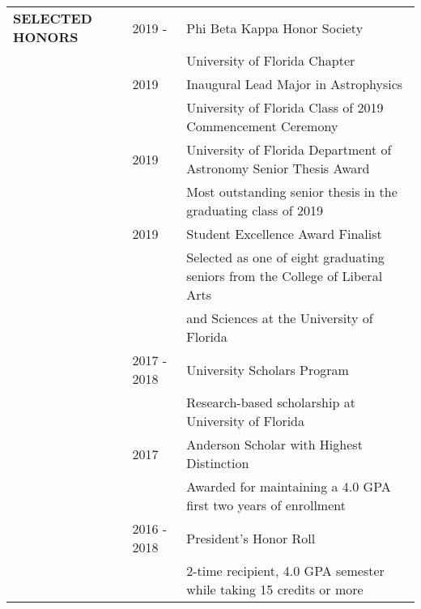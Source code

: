 \documentclass{article}
\begin{document}

\begin{tabular}{p{4cm}p{2.2cm}l}
    \large{\textbf{SELECTED \newline HONORS}} & 2019 - & Phi Beta Kappa Honor Society \vspace{-0.45cm}\\
    && \small University of Florida Chapter \vspace{0.125cm}\\
    
    & 2019 & Inaugural Lead Major in Astrophysics \\
    && \small University of Florida Class of 2019 Commencement Ceremony \vspace{0.125cm}\\
    
    & 2019 & University of Florida Department of Astronomy Senior Thesis Award \\
    && \small Most outstanding senior thesis in the graduating class of 2019 \vspace{0.125cm}\\
    
    & 2019 & Student Excellence Award Finalist \\
    && \small Selected as one of eight graduating seniors from the College of Liberal Arts \\ && \small and Sciences at the University of Florida \vspace{0.125cm}\\
    
    & 2017 - 2018 & University Scholars Program \\
    && \small Research-based scholarship at University of Florida \vspace{0.125cm}\\
    
    & 2017 & Anderson Scholar with Highest Distinction \\
    && \small Awarded for maintaining a 4.0 GPA first two years of enrollment \vspace{0.125cm}\\
    
    & 2016 - 2018 & President's Honor Roll \\
    && \small 2-time recipient, 4.0 GPA semester while taking 15 credits or more \vspace{0.125cm}\\
    

\end{tabular}
\end{document}

